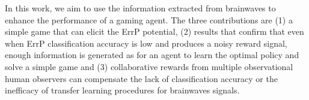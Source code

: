 \documentclass[journal]{IEEEtran}
\begin{document}
In this work, we aim to use the information extracted from brainwaves to enhance the performance of a gaming agent.  The three contributions are (1) a simple game that can elicit the ErrP potential, (2) results that confirm that even when ErrP classification accuracy is low and produces a noisy reward signal, enough information is generated as for an agent to learn the optimal policy and solve a simple game and (3) collaborative rewards from multiple observational human observers can compensate the lack of classification accuracy or the inefficacy of transfer learning procedures for brainwaves signals.


%
%



%
%
\end{document}
